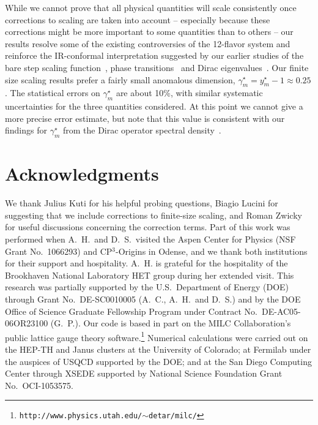 \documentclass[aps,prl,twocolumn,]{revtex4}  %
\begin{document}
While we cannot prove that all physical quantities will scale consistently once corrections to scaling are taken into account -- especially because these corrections might be more important to some quantities than to others -- our results resolve some of the existing controversies of the 12-flavor system and reinforce the IR-conformal interpretation suggested by our earlier studies of the bare step scaling function~\cite{Hasenfratz:2011xn}, phase transitions~\cite{Hasenfratz:2013uha} and Dirac eigenvalues~\cite{Cheng:2013eu}.
Our finite size scaling results prefer a fairly small anomalous dimension, $\gamma_m^{\star} = y_m^{\star} - 1 \approx 0.25$.
The statistical errors on $\gamma_m^{\star}$ are about 10\%, with similar systematic uncertainties for the three quantities considered.
At this point we cannot give a more precise error estimate, but note that this value is consistent with our findings for $\gamma_m^{\star}$ from the Dirac operator spectral density~\cite{Cheng:2013eu}.


\section*{Acknowledgments} %
We thank Julius Kuti for his helpful probing questions, Biagio Lucini for suggesting that we include corrections to finite-size scaling, and Roman Zwicky for useful discussions concerning the correction terms.
Part of this work was performed when A.~H.\ and D.~S.\ visited the Aspen Center for Physics (NSF Grant No.~1066293) and CP$^3$-Origins in Odense, and we thank both institutions for their support and hospitality. A.~H. is grateful for the hospitality of the Brookhaven National Laboratory HET group during her extended visit.
This research was partially supported by the U.S.~Department of Energy (DOE) through Grant No.~DE-SC0010005 (A.~C., A.~H.\ and D.~S.) and by the DOE Office of Science Graduate Fellowship Program under Contract No.~DE-AC05-06OR23100 (G.~P.).
Our code is based in part on the MILC Collaboration's public lattice gauge theory software.\footnote{\texttt{http://www.physics.utah.edu/$\sim$detar/milc/}}
Numerical calculations were carried out on the HEP-TH and Janus clusters at the University of Colorado; at Fermilab under the auspices of USQCD supported by the DOE; and at the San Diego Computing Center through XSEDE supported by National Science Foundation Grant No.~OCI-1053575.



{\renewcommand{\baselinestretch}{0.86} %
  
  
}
\end{document}
